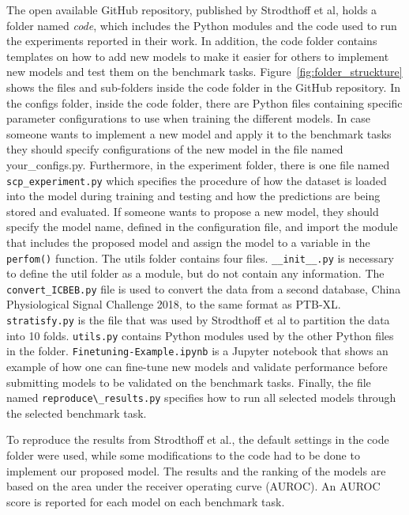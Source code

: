 The open available GitHub repository, published by Strodthoff et al, holds a folder named \textit{code}, which includes the Python modules and the code used to run the experiments reported in their work. In addition, the code folder contains templates on how to add new models to make it easier for others to implement new models and test them on the benchmark tasks. Figure~\ref{fig:folder_struckture} shows the files and sub-folders inside the code folder in the GitHub repository. In the configs folder, inside the code folder, there are Python files containing specific parameter configurations to use when training the different models. In case someone wants to implement a new model and apply it to the benchmark tasks they should specify configurations of the new model in the file named your\_configs.py. Furthermore, in the experiment folder, there is one file named \\ \verb|scp_experiment.py| which specifies the procedure of how the dataset is loaded into the model during training and testing and how the predictions are being stored and evaluated. If someone wants to propose a new model, they should specify the model name, defined in the configuration file, and import the module that includes the proposed model and assign the model to a variable in the \verb|perfom()| function. The utils folder contains four files. \verb|__init__.py| is necessary to define the util folder as a module, but do not contain any information. The \verb|convert_ICBEB.py| file is used to convert the data from a second database, China Physiological Signal Challenge 2018, to the same format as PTB-XL. \verb|stratisfy.py| is the file that was used by Strodthoff et al to partition the data into 10 folds. \verb|utils.py| contains Python modules used by the other Python files in the folder. \verb|Finetuning-Example.ipynb| is a Jupyter notebook that shows an example of how one can fine-tune new models and validate performance before submitting models to be validated on the benchmark tasks. Finally, the file named \verb|reproduce\_results.py| specifies how to run all selected models through the selected benchmark task.

To reproduce the results from Strodthoff et al., the default settings in the code folder were used, while some modifications to the code had to be done to implement our proposed model. The results and the ranking of the models are based on the area under the receiver operating curve (AUROC). An AUROC score is reported for each model on each benchmark task. 

